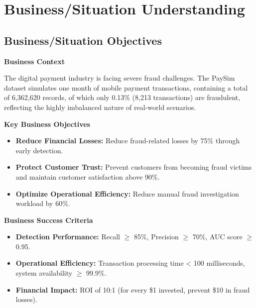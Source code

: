 \documentclass[sigplan,screen]{acmart}
\begin{document}


\maketitle

\section{Business/Situation Understanding}
\subsection{Business/Situation Objectives}

\textbf{Business Context}

The digital payment industry is facing severe fraud challenges. The PaySim dataset simulates one month of mobile payment transactions, containing a total of 6,362,620 records, of which only 0.13\% (8,213 transactions) are fraudulent, reflecting the highly imbalanced nature of real-world scenarios.

\textbf{Key Business Objectives}

\begin{itemize}
\item \textbf{Reduce Financial Losses:} Reduce fraud-related losses by 75\% through early detection.
\item \textbf{Protect Customer Trust:} Prevent customers from becoming fraud victims and maintain customer satisfaction above 90\%.
\item \textbf{Optimize Operational Efficiency:} Reduce manual fraud investigation workload by 60\%.
\end{itemize}

\textbf{Business Success Criteria}

\begin{itemize}
\item \textbf{Detection Performance:} Recall $\geq$ 85\%, Precision $\geq$ 70\%, AUC score $\geq$ 0.95.
\item \textbf{Operational Efficiency:} Transaction processing time < 100 milliseconds, system availability $\geq$ 99.9\%.
\item \textbf{Financial Impact:} ROI of 10:1 (for every \$1 invested, prevent \$10 in fraud losses).
\end{itemize}
\end{document}
